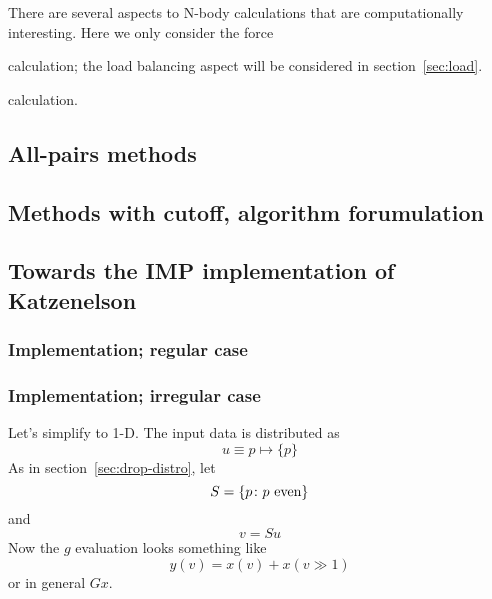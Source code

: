 
There are several aspects to N-body calculations that are
computationally interesting. Here we only consider the force
\begin{longstory}
calculation; the load balancing aspect will be considered in
section~\ref{sec:load}.
\end{longstory}
\begin{shortstory}
calculation.
\end{shortstory}

\subsection{All-pairs methods}
\label{sec:bh15}



\subsection{Methods with cutoff, algorithm forumulation}


\subsection{Towards the IMP implementation of Katzenelson}


\subsubsection{Implementation; regular case}


\subsubsection{Implementation; irregular case}

Let's simplify to 1-D. The input data is distributed as 
\[ u\equiv p\mapsto\{p\} \]
As in section~\ref{sec:drop-distro}, let
\[ S = \{p\colon \hbox{$p$ even}\} \]
and
\[ v=Su \]
Now the $g$ evaluation looks something like
\[ y(v) = x(v)+x(v\gg 1) \]
or in general $Gx$.

